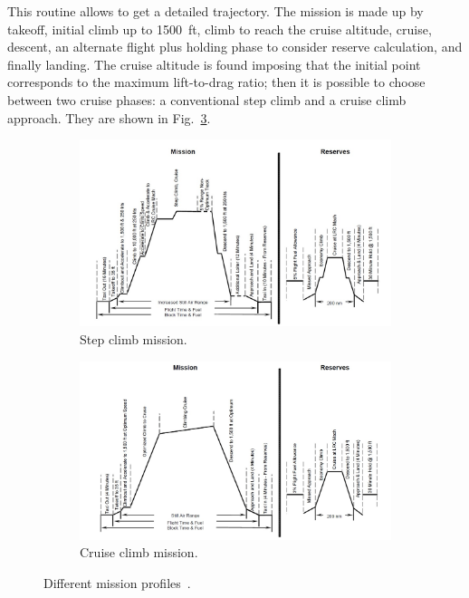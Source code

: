 This routine allows to get a detailed trajectory. 
The mission is made up by takeoff, initial climb up to 1500~ft, climb to reach the cruise altitude, cruise, descent, an alternate flight plus holding phase to consider reserve calculation, and finally landing. The cruise altitude is found imposing that the initial point corresponds to the maximum lift-to-drag ratio; then it is possible to choose between two cruise phases: a conventional step climb and a cruise climb approach. 
They are shown in Fig.~\ref{fig:mission_profile}.
\begin{figure}[!h]
	\centering
	\begin{subfigure}{0.8\textwidth}
		\includegraphics[keepaspectratio, width=\textwidth]{images/chap2/step_climb.jpg}
		\caption{Step climb mission.}
		\label{subfig:step_climb}
	\end{subfigure}
	\begin{subfigure}{0.8\textwidth}
		\includegraphics[keepaspectratio, width=\textwidth]{images/chap2/cruise_climb.jpg}
		\caption{Cruise climb mission.}
		\label{subfig:cruise_climb}
	\end{subfigure}
	\caption{Different mission profiles~\cite{bib:bradley_sugar_p1}.}
	\label{fig:mission_profile}
\end{figure}

